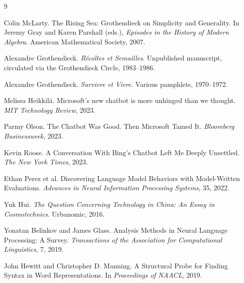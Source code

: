 \documentclass[12pt,a4paper]{article}
\begin{document}

\begin{thebibliography}{9}

Colin McLarty.
\newblock The Rising Sea: Grothendieck on Simplicity and Generality.
\newblock In Jeremy Gray and Karen Parshall (eds.), \emph{Episodes in the History of Modern Algebra}. American Mathematical Society, 2007.

Alexandre Grothendieck.
\newblock \emph{R\'ecoltes et Semailles}.
\newblock Unpublished manuscript, circulated via the Grothendieck Circle, 1983--1986.

Alexandre Grothendieck.
\newblock \emph{Survivre et Vivre}.
\newblock Various pamphlets, 1970--1972.

Melissa Heikkil\"a.
\newblock Microsoft's new chatbot is more unhinged than we thought.
\newblock \emph{MIT Technology Review}, 2023.

Parmy Olson.
\newblock The Chatbot Was Good. Then Microsoft Tamed It.
\newblock \emph{Bloomberg Businessweek}, 2023.

Kevin Roose.
\newblock A Conversation With Bing's Chatbot Left Me Deeply Unsettled.
\newblock \emph{The New York Times}, 2023.

Ethan Perez et al.
\newblock Discovering Language Model Behaviors with Model-Written Evaluations.
\newblock \emph{Advances in Neural Information Processing Systems}, 35, 2022.

Yuk Hui.
\newblock \emph{The Question Concerning Technology in China: An Essay in Cosmotechnics}.
\newblock Urbanomic, 2016.

Yonatan Belinkov and James Glass.
\newblock Analysis Methods in Neural Language Processing: A Survey.
\newblock \emph{Transactions of the Association for Computational Linguistics}, 7, 2019.

John Hewitt and Christopher D. Manning.
\newblock A Structural Probe for Finding Syntax in Word Representations.
\newblock In \emph{Proceedings of NAACL}, 2019.

\end{thebibliography}
\end{document}
